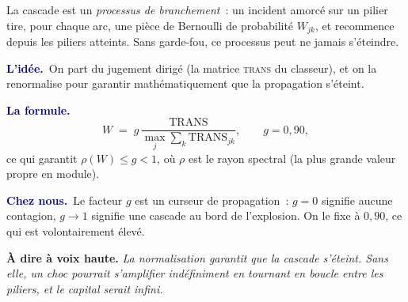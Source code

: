 \documentclass[11pt,a4paper]{article}
\newcommand{\lidee}[1]{\smallskip\noindent\textcolor{navy}{\textbf{L'idée.}}\ #1\par}
\newcommand{\laformule}[1]{\smallskip\noindent\textcolor{navy}{\textbf{La formule.}}\ #1\par}
\newcommand{\cheznous}[1]{\smallskip\noindent\textcolor{navy}{\textbf{Chez nous.}}\ #1\par}
\newcommand{\laphrase}[1]{\begin{phrasebox}\textbf{À dire à voix haute.} \emph{#1}\end{phrasebox}}
\begin{document}
\begin{center}
\end{center}

\noindent La cascade est un \emph{processus de branchement}~: un incident amorcé sur un pilier
tire, pour chaque arc, une pièce de Bernoulli de probabilité $W_{jk}$, et recommence depuis les
piliers atteints. Sans garde-fou, ce processus peut ne jamais s'éteindre.

\lidee{On part du jugement dirigé (la matrice \textsc{trans} du classeur), et on la
renormalise pour garantir mathématiquement que la propagation s'éteint.}

\laformule{
\[
  W \;=\; g\,\frac{\mathrm{TRANS}}{\max_j \sum_k \mathrm{TRANS}_{jk}},
  \qquad g=0{,}90 ,
\]
ce qui garantit $\rho(W)\le g<1$, où $\rho$ est le rayon spectral (la plus grande valeur
propre en module).}

\cheznous{Le facteur $g$ est un curseur de propagation~: $g=0$ signifie aucune contagion,
$g\to1$ signifie une cascade au bord de l'explosion. On le fixe à $0{,}90$, ce qui est
volontairement élevé.}

\laphrase{La normalisation garantit que la cascade s'éteint. Sans elle, un choc pourrait
s'amplifier indéfiniment en tournant en boucle entre les piliers, et le capital serait
infini.}
\end{document}
